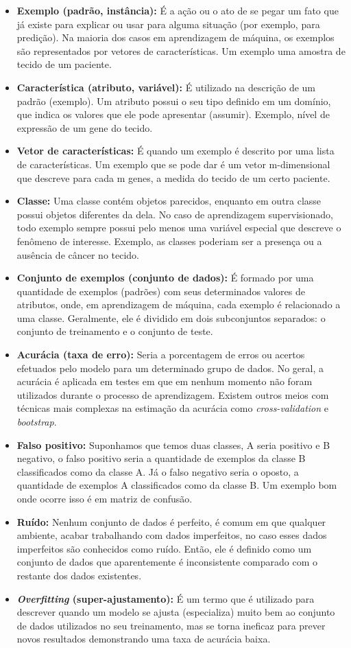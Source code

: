 \begin{itemize}
    \item \textbf{Exemplo (padrão, instância):} É a ação ou o ato de se pegar um fato que já existe para explicar ou usar para alguma situação (por exemplo, para predição). Na maioria dos casos em aprendizagem de máquina, os exemplos são representados por vetores de características. Um exemplo uma amostra de tecido de um paciente.
    \item \textbf{Característica (atributo, variável):} É utilizado na descrição de um padrão (exemplo). Um atributo possui o seu tipo definido em um domínio, que indica os valores que ele pode apresentar (assumir). Exemplo, nível de expressão de um gene do tecido.
    \item \textbf{Vetor de características:} É quando um exemplo é descrito por uma lista de características. Um exemplo que se pode dar é um vetor m-dimensional que descreve para cada m genes, a medida do tecido de um certo paciente.
    \item \textbf{Classe:} Uma classe contém objetos parecidos, enquanto em outra classe possui objetos diferentes da dela. No caso de aprendizagem supervisionado, todo exemplo sempre possui pelo menos uma variável especial que descreve o fenômeno de interesse. Exemplo, as classes poderiam ser a presença ou a ausência de câncer no tecido.
    \item \textbf{Conjunto de exemplos (conjunto de dados):} É formado por uma quantidade de exemplos (padrões) com seus determinados valores de atributos, onde, em aprendizagem de máquina, cada exemplo é relacionado a uma classe. Geralmente, ele é dividido em dois subconjuntos separados: o conjunto de treinamento e o conjunto de teste.
    \item \textbf{Acurácia (taxa de erro):} Seria a porcentagem de erros ou acertos efetuados pelo modelo para um determinado grupo de dados. No geral, a acurácia é aplicada em testes em que em nenhum momento não foram utilizados durante o processo de aprendizagem. Existem outros meios com técnicas mais complexas na estimação da acurácia como \textit{cross-validation} e \textit{bootstrap}. 
    \item \textbf{Falso positivo:} Suponhamos que temos duas classes, A seria positivo e B negativo, o falso positivo seria a quantidade de exemplos da classe B classificados como da classe A. Já o falso negativo seria o oposto, a quantidade de exemplos A classificados como da classe B. Um exemplo bom onde ocorre isso é em matriz de confusão. 
    \item \textbf{Ruído:} Nenhum conjunto de dados é perfeito, é comum em que qualquer ambiente, acabar trabalhando com dados imperfeitos, no caso esses dados imperfeitos são conhecidos como ruído. Então, ele é definido como um conjunto de dados que aparentemente é inconsistente comparado com o restante dos dados existentes. 
    \item \textbf{\textit{Overfitting} (super-ajustamento):} É um termo que é utilizado para descrever quando um modelo se ajusta (especializa) muito bem ao conjunto de dados utilizados no seu treinamento, mas se torna ineficaz para prever novos resultados demonstrando uma taxa de acurácia baixa.
\end{itemize}

